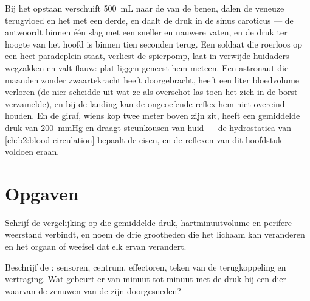 \begin{example}\label{ex:b2:blood-pressure:standing}
Bij het opstaan verschuift \qty{500}{mL}  naar de  van de benen,
dalen de veneuze terugvloed en het  met een derde, en daalt de druk
in de sinus caroticus --- de  antwoordt binnen één slag met een
sneller  en nauwere vaten, en de druk ter hoogte van het hoofd is binnen
tien seconden terug. Een soldaat die roerloos op een heet paradeplein staat,
verliest de spierpomp, laat  in verwijde huidaders wegzakken en valt
flauw: plat liggen geneest hem meteen. Een astronaut die maanden zonder
zwaartekracht heeft doorgebracht, heeft een liter bloedvolume verloren (de
nier scheidde uit wat ze als overschot las toen het  zich in de borst
verzamelde), en bij de landing kan de ongeoefende reflex hem niet overeind
houden. En de giraf, wiens kop twee meter boven zijn  zit, heeft een
gemiddelde druk van \qty{200}{mmHg} en draagt steunkousen van huid --- de
hydrostatica van \cref{ch:b2:blood-circulation} bepaalt de eisen, en de
reflexen van dit hoofdstuk voldoen eraan.
\end{example}

\section{Opgaven}

\begin{exercise}[$\star$]\label{exo:b2:blood-pressure:1}
Schrijf de vergelijking op die gemiddelde druk, hartminuutvolume en perifere
weerstand verbindt, en noem de drie grootheden die het lichaam kan veranderen
en het orgaan of weefsel dat elk ervan verandert.
\end{exercise}

\begin{exercise}[$\star$]\label{exo:b2:blood-pressure:2}
Beschrijf de : sensoren, centrum, effectoren, teken van de
terugkoppeling en vertraging. Wat gebeurt er van minuut tot minuut met de
druk bij een dier waarvan de zenuwen van de  zijn doorgesneden?
\end{exercise}


